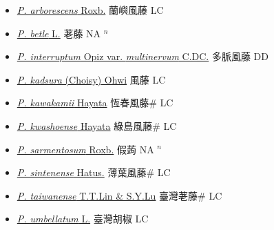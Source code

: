\begin{itemize}
  \begin{itemize}
        \item[] \href{http://www.theplantlist.org/tpl1.1/search?q=Piper+arborescens}{\textit{P. arborescens} Roxb.}   蘭嶼風藤 LC
        \item[] \href{http://www.theplantlist.org/tpl1.1/search?q=Piper+betle}{\textit{P. betle} L.}   荖藤 NA $^n$
        \item[] \href{http://www.theplantlist.org/tpl1.1/search?q=Piper+interruptum+var.+multinervum}{\textit{P. interruptum} Opiz var. \textit{multinervum} C.DC.}   多脈風藤 DD
        \item[] \href{http://www.theplantlist.org/tpl1.1/search?q=Piper+kadsura}{\textit{P. kadsura} (Choisy) Ohwi}   風藤 LC
        \item[] \href{http://www.theplantlist.org/tpl1.1/search?q=Piper+kawakamii}{\textit{P. kawakamii} Hayata}   恆春風藤\# LC
        \item[] \href{http://www.theplantlist.org/tpl1.1/search?q=Piper+kwashoense}{\textit{P. kwashoense} Hayata}   綠島風藤\# LC
        \item[] \href{http://www.theplantlist.org/tpl1.1/search?q=Piper+sarmentosum}{\textit{P. sarmentosum} Roxb.}   假蒟 NA $^n$
        \item[] \href{http://www.theplantlist.org/tpl1.1/search?q=Piper+sintenense}{\textit{P. sintenense} Hatus.}   薄葉風藤\# LC
        \item[] \href{http://www.theplantlist.org/tpl1.1/search?q=Piper+taiwanense}{\textit{P. taiwanense} T.T.Lin \& S.Y.Lu}   臺灣荖藤\# LC
        \item[] \href{http://www.theplantlist.org/tpl1.1/search?q=Piper+umbellatum}{\textit{P. umbellatum} L.}   臺灣胡椒 LC
  \end{itemize}
  \end{itemize}
